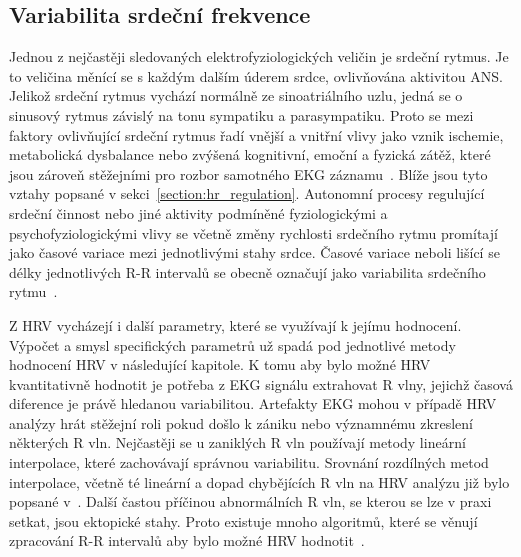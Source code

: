 \subsection{Variabilita srdeční frekvence}
\label{section:hrv}
Jednou z nejčastěji sledovaných elektrofyziologických veličin je srdeční rytmus.
Je to veličina měnící se s každým dalším úderem srdce, ovlivňována aktivitou
ANS. Jelikož srdeční rytmus vychází normálně ze sinoatriálního uzlu, jedná se o
sinusový rytmus závislý na tonu sympatiku a parasympatiku. Proto se mezi faktory
ovlivňující srdeční rytmus řadí vnější a vnitřní vlivy jako vznik ischemie,
metabolická dysbalance nebo zvýšená kognitivní, emoční a fyzická zátěž, které
jsou zároveň stěžejními pro rozbor samotného EKG záznamu~\cite{Pumprla2014}.
Blíže jsou tyto vztahy popsané v sekci~\ref{section:hr_regulation}. Autonomní
procesy regulující srdeční činnost nebo jiné aktivity podmíněné fyziologickými a
psychofyziologickými vlivy se včetně změny rychlosti srdečního rytmu promítají
jako časové variace mezi jednotlivými stahy srdce. Časové variace neboli lišící
se délky jednotlivých R-R intervalů se obecně označují jako variabilita
srdečního rytmu~\cite{Pumprla2014,Rajendra2007}.

Z HRV vycházejí i další parametry, které se využívají k jejímu hodnocení.
Výpočet a smysl specifických parametrů už spadá pod jednotlivé metody hodnocení
HRV v následující kapitole. K tomu aby bylo možné HRV kvantitativně hodnotit je
potřeba z EKG signálu extrahovat R vlny, jejichž časová diference je právě
hledanou variabilitou. Artefakty EKG mohou v případě HRV analýzy hrát stěžejní
roli pokud došlo k zániku nebo významnému zkreslení některých R vln. Nejčastěji
se u zaniklých R vln používají metody lineární interpolace, které zachovávají
správnou variabilitu. Srovnání rozdílných metod interpolace, včetně té lineární
a dopad chybějících R vln na HRV analýzu již bylo popsané
v~\cite{Kim2007,Peltola2012,Morelli2019}. Další častou příčinou abnormálních R
vln, se kterou se lze v praxi setkat, jsou ektopické stahy. Proto existuje mnoho
algoritmů, které se věnují zpracování R-R intervalů aby bylo možné HRV
hodnotit~\cite{Lipponen2019}.

